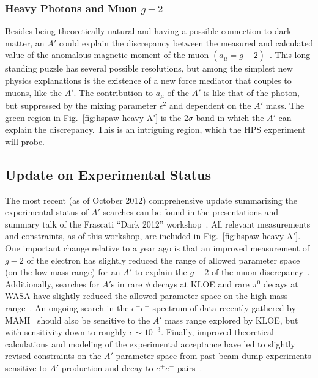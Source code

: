 \subsubsection{Heavy Photons and Muon $g-2$}

Besides being theoretically natural and having a possible connection to dark matter, an $A'$ could explain the discrepancy between the measured and 
calculated value of the anomalous magnetic moment of the muon $(a_\mu=g-2)$~\cite{Pospelov:2008zw}.  
This long-standing puzzle has several possible resolutions, but among the simplest new physics explanations
is the existence of a new force mediator that couples to muons, like the $A'$.  The contribution to $a_\mu$ of the $A'$ 
is like that of the photon, but suppressed by the mixing parameter $\epsilon^2$ and dependent on the $A'$ mass.  
The green region in Fig.~\ref{fig:hspaw-heavy-A'} is the 2$\sigma$ band in which the $A'$ can 
explain the discrepancy.  This is an intriguing region, which the HPS experiment will probe.  

\subsection{Update on Experimental Status}

The most recent (as of October 2012) comprehensive update summarizing the experimental status of $A'$ searches 
can be found in the presentations and summary talk of the Frascati ``Dark 2012'' workshop~\cite{Dark2012}.
All relevant measurements and constraints, as of this workshop, are included in Fig.~\ref{fig:hspaw-heavy-A'}.
One important change relative to a year ago is that an improved measurement of $g-2$ of the electron
has slightly reduced the range of allowed parameter space (on the low mass range) for an $A'$ to explain the $g-2$ of the muon 
discrepancy~\cite{endo:g2e}. 
Additionally, searches for $A'$s in rare $\phi$ decays at KLOE and rare $\pi^0$ decays at WASA have slightly reduced 
the allowed parameter space on the high mass range~\cite{rarek}. 
An ongoing search in the $e^+e^-$ spectrum of data recently gathered by MAMI~\cite{Merkel:2011ze} should also 
be sensitive to the $A'$ mass range explored by KLOE, but with sensitivity down to roughly $\epsilon\sim 10^{-3}$. 
Finally, improved theoretical calculations and modeling of the experimental acceptance have led to slightly revised constraints on the 
$A'$ parameter space from past beam dump experiments sensitive to $A'$ production and decay to $e^+e^-$ pairs~\cite{andreas}.


